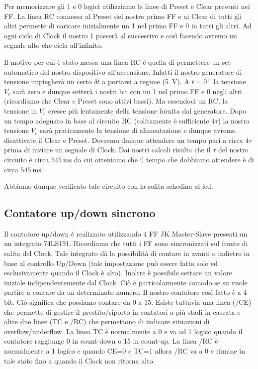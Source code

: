 Per memorizzare gli 1 e 0 logici utilizziamo le linee di Preset e Clear presenti nei FF. La linea RC connessa al Preset del nostro primo FF e ai Clear di tutti gli altri permette di caricare inizialmente un 1 nel primo FF e 0 in tutti gli altri. Ad ogni ciclo di Clock il nostro 1 passerà al successivo e così facendo avremo un segnale alto che cicla all'infinito.

Il motivo per cui è stato messa una linea RC è quella di permettere un set automatico del nostro dispositivo all'accensione. Infatti il nostro generatore di tensione impiegherà un certo $\delta t$ a portarsi a regime (\SI{5}{\volt}). A $t=0^+$ la tensione $V_c$ sarà zero e dunque setterà i nostri bit con un 1 nel primo FF e 0 negli altri (ricordiamo che Clear e Preset sono attivi bassi). Ma essendoci un RC, la tensione in $V_c$ cresce più lentamente della tensione fornita dal generatore. Dopo un tempo adeguato in base al circuito RC (solitamente è sufficiente $4\tau$) la nostra tensione $V_c$ sarà praticamente la tensione di alimentazione e dunque avremo disattivate il Clear e Preset. Dovremo dunque attendere un tempo pari a circa $4\tau$ prima di inviare un segnale di Clock. Dai nostri calcoli risulta che il $\tau$ del nostro circuito è circa $\SI{545}{\milli\second}$ da cui otteniamo che il tempo che dobbiamo attendere è di circa $\SI{545}{\milli\second}$.

Abbiamo dunque verificato tale circuito con la solita schedina al led. 

\subsection{Contatore up/down sincrono}

Il contatore up/down è realizzato utilizzando 4 FF JK Master-Slave presenti un un integrato 74LS191. Ricordiamo che tutti i FF sono sincronizzati sul fronte di salita del Clock. Tale integrato dà la possibilità di contare in avanti o indietro in base al controllo Up/Down (tale impostazione può essere fatta solo ed esclusivamente quando il Clock è alto). Inoltre è possibile settare un valore iniziale indipendentemente dal Clock. Ciò è particolarmente comodo se su vuole partire a contare da un determinato numero. Il nostro contatore così fatto è a 4 bit. Ciò significa che possiamo contare da 0 a 15. Esiste tuttavia una linea (/CE) che permette di gestire il prestito/riporto in contatori a più stadi in cascata e altre due linee (TC e /RC) che permettono di indicare situazioni di overflow/underflow. La linea TC è normalmente a 0 e va ad 1 logico quando il contatore raggiunge 0 in count-down o 15 in count-up. La linea /RC è normalmente a 1 logico e quando CE=0 e TC=1 allora /RC va a 0 e rimane in tale stato fino a quando il Clock non ritorna alto.


